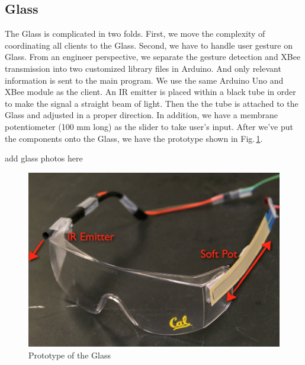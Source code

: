 \subsection{Glass}
\label{sec:glass}

The Glass is complicated in two folds. First, we move the complexity of coordinating all clients to the Glass. Second, we have to handle user gesture on Glass. From an engineer perspective, we separate the gesture detection and XBee transmission into two customized library files in Arduino. And only relevant information is sent to the main program. We use the same Arduino Uno and XBee module as the client. An IR emitter is placed within a black tube in order to make the signal a straight beam of light. Then the the tube is attached to the Glass and adjusted in a proper direction. In addition, we have a membrane potentiometer (100 mm long) as the slider to take user's input. After we've put the components onto the Glass, we have the prototype shown in Fig.\,\ref{fig:glass}.

{\color{red} add glass photos here}
\begin{figure}
  \centering
  \includegraphics[width=0.85\linewidth]{../figs/glass.png}
  \caption{Prototype of the Glass}
  \label{fig:glass}
\end{figure}


